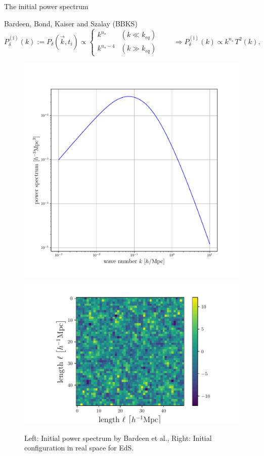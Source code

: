\documentclass[10pt]{beamer}
\begin{document}
\begin{frame}{The initial power spectrum}
\begin{block}{Bardeen, Bond, Kaiser and
		Szalay (BBKS) }
	\begin{equation*}
	P^{(\mathrm{i})}_{\delta}(k):= P_{\delta}(\vec{k}, t_i)  \propto
	\begin{cases}
	k^{n_s} & (k  \ll k_{eq})\\
	k^{n_s -4} & (k \gg k_{eq})
	\end{cases}
	\qquad
	\Rightarrow
	P^{(\mathrm{i})}_{\delta}(k) \propto k^{n_s}\, T^2(k),
	\end{equation*}
	\begin{figure}
		\centering
		\includegraphics[width=0.365 \textwidth]{Bardeenps.pdf}
		\includegraphics[width=0.55 \textwidth]{InitialConfigurationRealSpace.pdf}
		\caption{Left: Initial power spectrum by Bardeen et al., Right: Initial configuration in real space for EdS.}
	\end{figure}
	
\end{block}
\end{frame}
\end{document}
